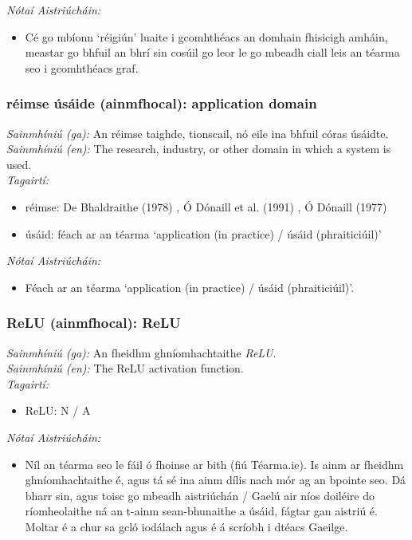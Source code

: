  \noindent \textit{Nótaí Aistriúcháin:}
\begin{itemize}
	\item Cé go mbíonn `réigiún' luaite i gcomhthéacs an domhain fhisicigh amháin, meastar go bhfuil an bhrí sin cosúil go leor le go mbeadh ciall leis an téarma seo i gcomhthéacs graf.
\end{itemize}


\subsubsection*{réimse úsáide (ainmfhocal): application domain}
 \noindent \textit{Sainmhíniú (ga):} An réimse taighde, tionscail, nó eile ina bhfuil córas úsáidte.
\\
 \noindent \textit{Sainmhíniú (en):} The research, industry, or other domain in which a system is used.
\\
 \noindent \textit{Tagairtí:}
\begin{itemize}
	\item réimse: De Bhaldraithe (1978) \cite{de-bhaldraithe}, Ó Dónaill et al. (1991) \cite{focloir-beag}, Ó Dónaill (1977) \cite{odonaill}
	\item úsáid: féach ar an téarma `application (in practice) / úsáid (phraiticiúil)'
\end{itemize}

 \noindent \textit{Nótaí Aistriúcháin:}
\begin{itemize}
	\item Féach ar an téarma `application (in practice) / úsáid (phraiticiúil)'.
\end{itemize}


\subsubsection*{ReLU (ainmfhocal): ReLU}
 \noindent \textit{Sainmhíniú (ga):} An fheidhm ghníomhachtaithe  \noindent \textit{ReLU}.
\\
 \noindent \textit{Sainmhíniú (en):} The ReLU activation function.
\\
 \noindent \textit{Tagairtí:}
\begin{itemize}
	\item ReLU: N / A
\end{itemize}

 \noindent \textit{Nótaí Aistriúcháin:}
\begin{itemize}
	\item Níl an téarma seo le fáil ó fhoinse ar bith (fiú Téarma.ie). Is ainm ar fheidhm ghníomhachtaithe é, agus tá sé ina ainm dílis nach mór ag an bpointe seo. Dá bharr sin, agus toisc go mbeadh aistriúchán / Gaelú air níos doiléire do ríomheolaithe ná an t-ainm sean-bhunaithe a úsáid, fágtar gan aistriú é. Moltar é a chur sa gcló iodálach agus é á scríobh i dtéacs Gaeilge.
\end{itemize}


